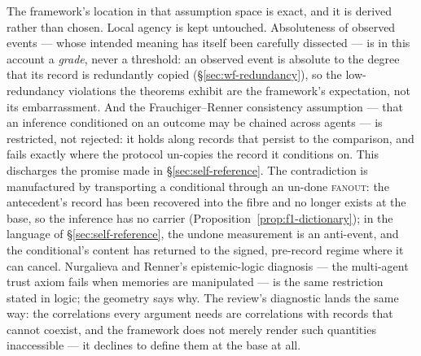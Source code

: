 The framework's location in that assumption space is exact, and it is derived
rather than chosen. Local agency is kept untouched. Absoluteness of observed
events --- whose intended meaning has itself been carefully dissected
\autocite{adlam2024nonabsoluteness} --- is in this account a \emph{grade}, never
a threshold: an observed event is absolute to the degree that its record is
redundantly copied (\S\ref{sec:wf-redundancy}), so the low-redundancy violations
the theorems exhibit are the framework's expectation, not its embarrassment.
And the Frauchiger--Renner consistency assumption --- that an inference
conditioned on an outcome may be chained across agents --- is restricted, not
rejected: it holds along records that persist to the comparison, and fails
exactly where the protocol un-copies the record it conditions on. This
discharges the promise made in \S\ref{sec:self-reference}. The contradiction is
manufactured by transporting a conditional through an un-done \textsc{fanout}:
the antecedent's record has been recovered into the fibre and no longer exists
at the base, so the inference has no carrier
(Proposition~\ref{prop:f1-dictionary}); in the language of
\S\ref{sec:self-reference}, the undone measurement is an anti-event, and the
conditional's content has returned to the signed, pre-record regime where it can
cancel. Nurgalieva and Renner's epistemic-logic diagnosis --- the multi-agent
trust axiom fails when memories are manipulated
\autocite{nurgalievarenner2020testing} --- is the same restriction stated in
logic; the geometry says why. The review's diagnostic lands the same way: the
correlations every argument needs are correlations with records that cannot
coexist, and the framework does not merely render such quantities inaccessible
--- it declines to define them at the base at all.

